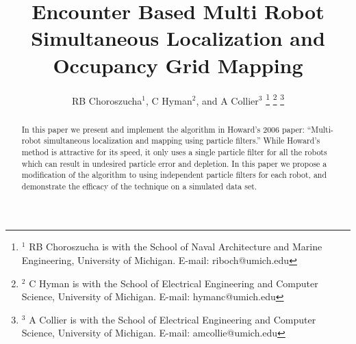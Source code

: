 \documentclass[letterpaper, 10 pt, conference]{ieeeconf}  %
\title{Encounter Based Multi Robot Simultaneous Localization and Occupancy Grid Mapping}
\author{RB Choroszucha$^{1}$, C Hyman$^{2}$, and A Collier$^{3}$ %
\thanks{$^{1}$ RB Choroszucha is with the School of Naval Architecture and Marine Engineering, University of Michigan.  E-mail: riboch{@}umich.edu}%
\thanks{$^{2}$ C Hyman is with the School of Electrical Engineering and Computer Science, University of Michigan. E-mail: {hymanc}{@}umich.edu}
\thanks{$^{3}$ A Collier is with the School of Electrical Engineering and Computer Science, University of Michigan. E-mail: {amcollie}{@}umich.edu}
}
\begin{document}
\maketitle
\thispagestyle{empty}
\pagestyle{empty}


\begin{abstract}

In this paper we present and implement the algorithm in Howard's 2006 paper: ``Multi-robot simultaneous localization and mapping using particle filters.''  While Howard's method is attractive for its speed, it only uses a single particle filter for all the robots which can result in undesired particle error and depletion.  In this paper we propose a modification of the algorithm to using independent particle filters for each robot, and demonstrate the efficacy of the technique on a simulated data set.  

\end{abstract}
















\addtolength{\textheight}{-12cm}   %







\end{document}
